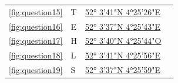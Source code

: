 \documentclass{article}
\newcommand{\locfifteen}{52° 3'41"N   4°25'26"E}
\newcommand{\urlfifteen}{https://example.com}
\newcommand{\letterfifteen}{T}
\newcommand{\notefifteen}{}
\newcommand{\locsixteen}{52° 3'37"N   4°25'43"E}
\newcommand{\urlsixteen}{https://example.com}
\newcommand{\lettersixteen}{E}
\newcommand{\notesixteen}{}
\newcommand{\locseventeen}{52° 3'40"N   4°25'44"O}
\newcommand{\urlseventeen}{https://example.com}
\newcommand{\letterseventeen}{H}
\newcommand{\noteseventeen}{}
\newcommand{\loceighteen}{52° 3'41"N   4°25'56"E}
\newcommand{\urleighteen}{https://example.com}
\newcommand{\lettereighteen}{L}
\newcommand{\noteeighteen}{}
\newcommand{\locnineteen}{ 52° 3'37"N  4°25'59"E}
\newcommand{\urlnineteen}{https://example.com}
\newcommand{\letternineteen}{S}
\newcommand{\notenineteen}{}
\begin{document}
\begin{tabular}{llll}
            \ref{fig:question15} & \letterfifteen  & \href{\urlfifteen}{\locfifteen} & \notefifteen \\
            \ref{fig:question16} & \lettersixteen  & \href{\urlsixteen}{\locsixteen} & \notesixteen \\
            \ref{fig:question17} & \letterseventeen  & \href{\urlseventeen}{\locseventeen} & \noteseventeen \\
            \ref{fig:question18} & \lettereighteen  & \href{\urleighteen}{\loceighteen} & \noteeighteen \\
            \ref{fig:question19} & \letternineteen  & \href{\urlnineteen}{\locnineteen} & \notenineteen \\
            \bottomrule
        \end{tabular}\label{tab:table}
\end{document}

